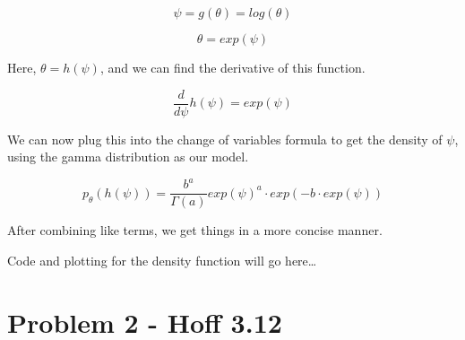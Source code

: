 \documentclass[12pt, letterpaper]{article}
\begin{document}
\begin{equation} 
\psi = g(\theta) = log(\theta) 
\end{equation} 

\begin{equation} 
\theta = exp(\psi) 
\end{equation} 

Here, $\theta = h(\psi)$, and we can find the derivative of this function. 

\begin{equation} 
\frac{d}{d\psi}h(\psi) = exp(\psi) 
\end{equation} 

We can now plug this into the change of variables formula to get the density of $\psi$, using the gamma distribution as our model. 

\begin{equation} 
  p_{\theta}(h(\psi)) = \frac{b^a}{\Gamma(a)}exp(\psi)^a \cdot exp(-b \cdot exp(\psi))  
\end{equation} 

After combining like terms, we get things in a more concise manner. 

Code and plotting for the density function will go here\dots 

\section{Problem 2 - Hoff 3.12}
\end{document}
